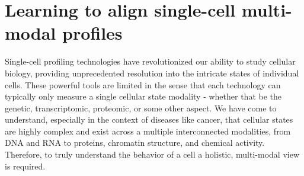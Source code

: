 \section{Learning to align single-cell multi-modal profiles}


Single-cell profiling technologies have revolutionized our ability to study cellular biology, providing unprecedented resolution into the intricate states of individual cells.
These powerful tools are limited in the sense that each technology can typically only measure a single cellular state modality - whether that be the genetic, transcriptomic, proteomic, or some other aspect.
We have come to understand, especially in the context of diseases like cancer,
that cellular states are highly complex and exist across a multiple interconnected modalities, from DNA and RNA to proteins, chromatin structure, and chemical activity. 
Therefore, to truly understand the behavior of a cell a holistic, multi-modal view is required.


